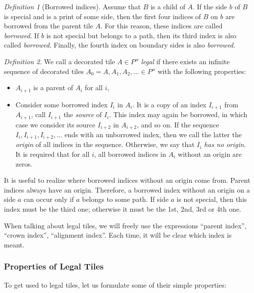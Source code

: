 \documentclass[12pt]{article}
\theoremstyle{remark}
\newtheorem{definition}{Definition}
\begin{document}
\begin{definition}[Borrowed indices]
Assume that $B$ is a child of $A$. If the side $b$ of $B$ is special and is 
a print of some side, then 
the first four indices of $B$ on $b$ 
are borrowed from the parent tile $A$.
For this reason, these indices are called \emph{borrowed}.
If $b$ is not special but belongs to a path, then its 
third index is also called \emph{borrowed}. 
Finally, the fourth index
on boundary sides is also  \emph{borrowed}.
\end{definition}



\begin{definition}
We call a decorated tile $A\in P''$ \emph{legal} if
there exists an infinite sequence of decorated tiles
$A_0=A,A_1,A_2,\dots\in P''$ with the following properties:
\begin{itemize}
\item $A_{i+1}$ is a parent of $A_{i}$ for all $i$,
\item
Consider some borrowed index $I_i$
in $A_{i}$. It is a copy of an index $I_{i+1}$ from $A_{i+1}$, call $I_{i+1}$ the \emph{source} of $I_i$. This index may again be borrowed, in which case we consider its source $I_{i+2}$ in $A_{i+2}$, and so on.
If the sequence $I_{i}, I_{i+1}, I_{i+2}, \dots$ ends with an unborrowed index,
then we call the latter the \emph{origin} of all indices in the sequence.
Otherwise, we say that $I_i$ \emph{has no origin}.
It is required that for all $i$, all borrowed indices in $A_{i}$ without an
origin are 
zeros.
\end{itemize}
\end{definition}
It is useful to realize where borrowed indices without an origin come from. Parent indices always have an origin.
Therefore, a borrowed index without an origin on a side $a$ can occur only if $a$ belongs to some path. If side $a$ is not special, then this index must be the third one; otherwise it must be the 1st, 2nd, 3rd or 4th one.





When talking about legal tiles, we will freely use the expressions
``parent index'', ``crown index'', ``alignment index''.
Each time, it will be clear which index is meant.









\subsubsection{Properties of Legal Tiles}
To get used to legal tiles,
let us formulate some of their simple properties:
\end{document}
